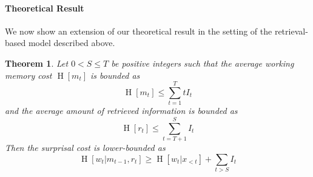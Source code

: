 \documentclass[11pt,letterpaper]{article}
\newcounter{theorem}
\newtheorem{thm}[theorem]{Theorem}
\begin{document}

\paragraph{Theoretical Result}
We now show an extension of our theoretical result in the setting of the retrieval-based model described above.

\begin{thm}
Let $0 < S \leq T$ be positive integers such that the average working memory cost $\operatorname{H}[m_t]$ is bounded as
	\begin{equation}
		\operatorname{H}[m_t] \leq \sum_{t=1}^T t I_t
	\end{equation}
	and the average amount of retrieved information is bounded as
	\begin{equation}
		\operatorname{H}[r_t] \leq \sum_{t=T+1}^S I_t
	\end{equation} %
	Then the surprisal cost is lower-bounded as
	\begin{equation}
		\operatorname{H}[w_t|m_{t-1}, r_t] \geq \operatorname{H}[w_t|x_{<t}] + \sum_{t>S} I_t
	\end{equation}
\end{thm}
\end{document}
